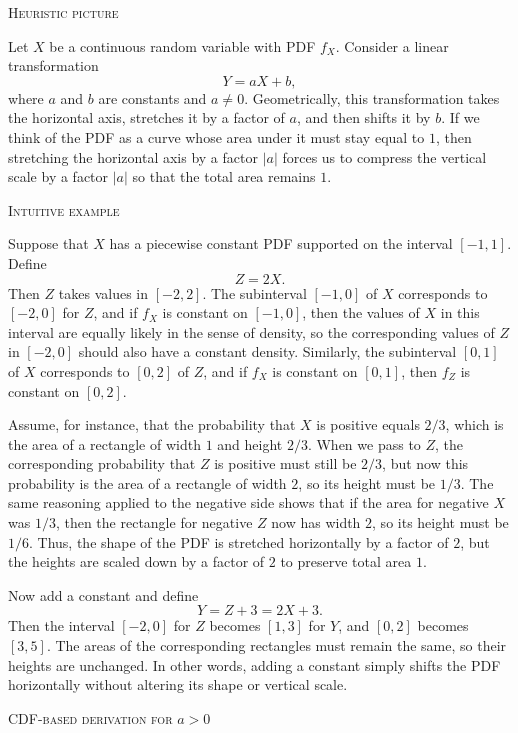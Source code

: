 \textsc{Heuristic picture}

Let \(X\) be a continuous random variable with PDF \(f_X\).  
Consider a linear transformation
\[
Y = aX + b,
\]
where \(a\) and \(b\) are constants and \(a \neq 0\).  
Geometrically, this transformation takes the horizontal axis, stretches it by a factor of \(a\), and then shifts it by \(b\).  
If we think of the PDF as a curve whose area under it must stay equal to \(1\), then stretching the horizontal axis by a factor \(|a|\) forces us to compress the vertical scale by a factor \(|a|\) so that the total area remains \(1\).

\textsc{Intuitive example}

Suppose that \(X\) has a piecewise constant PDF supported on the interval \([-1,1]\).  
Define
\[
Z = 2X.
\]
Then \(Z\) takes values in \([-2,2]\).  
The subinterval \([-1,0]\) of \(X\) corresponds to \([-2,0]\) for \(Z\), and if \(f_X\) is constant on \([-1,0]\), then the values of \(X\) in this interval are equally likely in the sense of density, so the corresponding values of \(Z\) in \([-2,0]\) should also have a constant density.  
Similarly, the subinterval \([0,1]\) of \(X\) corresponds to \([0,2]\) of \(Z\), and if \(f_X\) is constant on \([0,1]\), then \(f_Z\) is constant on \([0,2]\).

Assume, for instance, that the probability that \(X\) is positive equals \(2/3\), which is the area of a rectangle of width \(1\) and height \(2/3\).  
When we pass to \(Z\), the corresponding probability that \(Z\) is positive must still be \(2/3\), but now this probability is the area of a rectangle of width \(2\), so its height must be \(1/3\).  
The same reasoning applied to the negative side shows that if the area for negative \(X\) was \(1/3\), then the rectangle for negative \(Z\) now has width \(2\), so its height must be \(1/6\).  
Thus, the shape of the PDF is stretched horizontally by a factor of \(2\), but the heights are scaled down by a factor of \(2\) to preserve total area \(1\).

Now add a constant and define
\[
Y = Z + 3 = 2X + 3.
\]
Then the interval \([-2,0]\) for \(Z\) becomes \([1,3]\) for \(Y\), and \([0,2]\) becomes \([3,5]\).  
The areas of the corresponding rectangles must remain the same, so their heights are unchanged.  
In other words, adding a constant simply shifts the PDF horizontally without altering its shape or vertical scale.

\textsc{CDF-based derivation for \(a>0\)}


